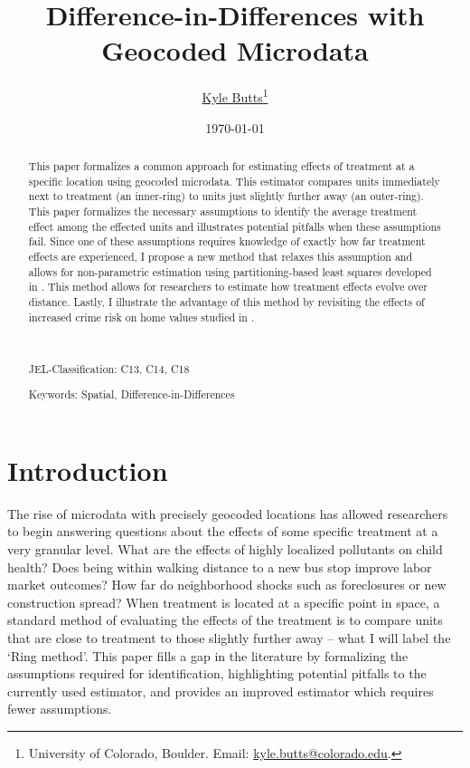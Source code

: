 \documentclass[10pt]{article}
\title{Difference-in-Differences with Geocoded Microdata}
\author{\href{https://kylebutts.com/}{Kyle Butts}\thanks{University of Colorado, Boulder. Email: \href{mailto:kyle.butts@colorado.edu}{kyle.butts@colorado.edu}.} %
}
\date{\today}
\begin{document}
\maketitle

\begin{abstract}
    This paper formalizes a common approach for estimating effects of treatment at a specific location using geocoded microdata. This estimator compares units immediately next to treatment (an inner-ring) to units just slightly further away (an outer-ring). This paper formalizes the necessary assumptions to identify the average treatment effect among the effected units and illustrates potential pitfalls when these assumptions fail. Since one of these assumptions requires knowledge of exactly how far treatment effects are experienced, I propose a new method that relaxes this assumption and allows for non-parametric estimation using partitioning-based least squares developed in \citet{Cattaneo_Crump_Farrell_Feng_2019}. This method allows for researchers to estimate how treatment effects evolve over distance. Lastly, I illustrate the advantage of this method by revisiting the effects of increased crime risk on home values studied in \citet{Linden_Rockoff_2008}. 

    \par~\par\noindent
    JEL-Classification: C13, C14, C18
    \par\noindent
    Keywords: Spatial, Difference-in-Differences
    \par
\end{abstract}
\newpage


\section{Introduction}

The rise of microdata with precisely geocoded locations has allowed researchers to begin answering questions about the effects of some specific treatment at a very granular level. What are the effects of highly localized pollutants on child health? Does being within walking distance to a new bus stop improve labor market outcomes? How far do neighborhood shocks such as foreclosures or new construction spread? When treatment is located at a specific point in space, a standard method of evaluating the effects of the treatment is to compare units that are close to treatment to those slightly further away -- what I will label the `Ring method'. This paper fills a gap in the literature by formalizing the assumptions required for identification, highlighting potential pitfalls to the currently used estimator, and provides an improved estimator which requires fewer assumptions. 
\end{document}
